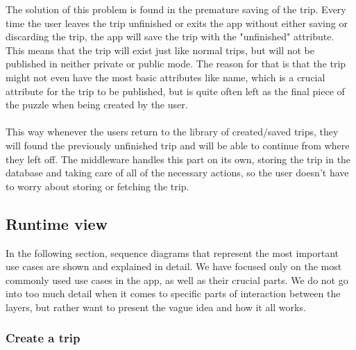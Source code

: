 The solution of this problem is found in the premature saving of the trip. Every time the user leaves the trip unfinished or exits the app without either saving or discarding the trip, the app will save the trip with the "unfinished" attribute. This means that the trip will exist just like normal trips, but will not be published in neither private or public mode. The reason for that is that the trip might not even have the most basic attributes like name, which is a crucial attribute for the trip to be published, but is quite often left as the final piece of the puzzle when being created by the user.\\ \\

This way whenever the users return to the library of created/saved trips, they will found the previously unfinished trip and will be able to continue from where they left off. The middleware handles this part on its own, storing the trip in the database and taking care of all of the necessary actions, so the user doesn't have to worry about storing or fetching the trip. 

\subsection{Runtime view}

\hspace{\parindent}In the following section, sequence diagrams that represent the most important use cases are shown and explained in detail. We have focused only on the most commonly used use cases in the app, as well as their crucial parts. We do not go into too much detail when it comes to specific parts of interaction between the layers, but rather want to present the vague idea and how it all works.
\newpage
\subsubsection{Create a trip}

